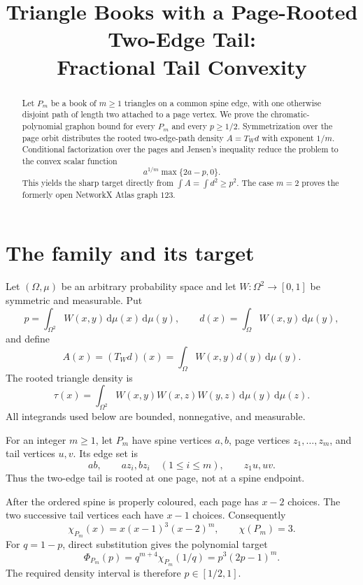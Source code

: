 \documentclass[11pt]{article}
\title{Triangle Books with a Page-Rooted Two-Edge Tail:\\
Fractional Tail Convexity}
\author{}
\date{}
\newcommand{\dd}{\,\mathrm d}
\begin{document}
\maketitle

\begin{abstract}
Let $P_m$ be a book of $m\geq1$ triangles on a common spine edge, with
one otherwise disjoint path of length two attached to a page vertex.  We
prove the chromatic-polynomial graphon bound for every $P_m$ and every
$p\geq1/2$.  Symmetrization over the page orbit distributes the rooted
two-edge-path density $A=T_Wd$ with exponent $1/m$.  Conditional
factorization over the pages and Jensen's inequality reduce the problem to
the convex scalar function
\[
 a^{1/m}\max\{2a-p,0\}.
\]
This yields the sharp target directly from $\int A=\int d^2\geq p^2$.
The case $m=2$ proves the formerly open NetworkX Atlas graph $123$.
\end{abstract}


\section{The family and its target}

Let $(\Omega,\mu)$ be an arbitrary probability space and let
$W\colon\Omega^2\to[0,1]$ be symmetric and measurable.  Put
\[
 p=\int_{\Omega^2}W(x,y)\dd\mu(x)\dd\mu(y),
 \qquad
 d(x)=\int_\Omega W(x,y)\dd\mu(y),
\]
and define
\[
 A(x)=(T_Wd)(x)=\int_\Omega W(x,y)d(y)\dd\mu(y).
\]
The rooted triangle density is
\[
 \tau(x)=\int_{\Omega^2}
 W(x,y)W(x,z)W(y,z)\dd\mu(y)\dd\mu(z).
\]
All integrands used below are bounded, nonnegative, and measurable.

For an integer $m\geq1$, let $P_m$ have spine vertices $a,b$, page
vertices $z_1,\ldots,z_m$, and tail vertices $u,v$.  Its edge set is
\[
 ab,\qquad az_i,bz_i\quad(1\leq i\leq m),
 \qquad z_1u,uv.
\]
Thus the two-edge tail is rooted at one page, not at a spine endpoint.

After the ordered spine is properly coloured, each page has $x-2$ choices.
The two successive tail vertices each have $x-1$ choices.  Consequently
\begin{equation}
 \chi_{P_m}(x)=x(x-1)^3(x-2)^m,
 \qquad \chi(P_m)=3.
 \label{eq:chromatic}
\end{equation}
For $q=1-p$, direct substitution gives the polynomial target
\begin{equation}
 \Phi_{P_m}(p)
 =q^{m+4}\chi_{P_m}(1/q)
 =p^3(2p-1)^m.
 \label{eq:target}
\end{equation}
The required density interval is therefore $p\in[1/2,1]$.
\end{document}
